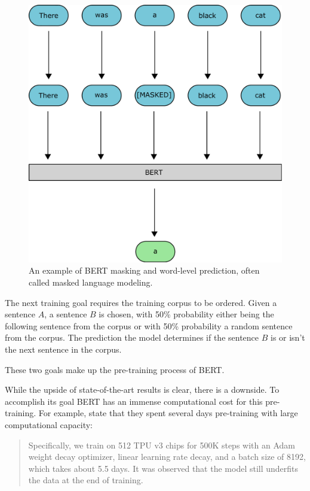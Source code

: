 \documentclass[nofilelist]{cslthse-msc}
\begin{document}
\begin{figure}[ht]
    \centering
    \includegraphics[width=\textwidth/2]{BERTmasking.pdf}
    \caption{An example of BERT masking and word-level prediction, often called masked language modeling.}
    \label{fig:BERTmasking}
\end{figure}

The next training goal requires the training corpus to be ordered. Given a sentence $A$, a sentence $B$ is chosen, with 50\% probability either being the following sentence from the corpus or with 50\% probability a random sentence from the corpus. The prediction the model determines if the sentence $B$ is or isn't the next sentence in the corpus. 

These two goals make up the pre-training process of BERT.

While the upside of state-of-the-art results is clear, there is a downside. To accomplish its goal BERT has an immense computational cost for this pre-training. For example, \citet{DBLP:journals/corr/abs-1906-08237} state that they spent several days pre-training with large computational capacity:

\begin{quote}
Specifically, we train on 512 TPU v3 chips for 500K steps with an Adam weight decay optimizer, linear learning rate decay, and a batch size of 8192, which takes about 5.5 days. It was observed that the model still underfits the data at the end of training.
\end{quote}
\end{document}
